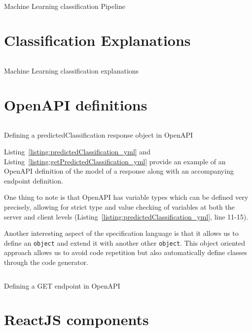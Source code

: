 \documentclass[\version]{l4proj}
\begin{document}
\begin{listing}[H]
    \inputminted{python}{code/ml_pipeline.py}
    \caption{Machine Learning classification Pipeline}\label{listing:ml_pipeline}
\end{listing}

\section{Classification Explanations}

\begin{listing}[H]
    \inputminted{python}{code/explanations.py}
    \caption{Machine Learning classification explanations}\label{listing:ml_explanations}
\end{listing}

\section{OpenAPI definitions}

\begin{listing}[H]
    \inputminted{yaml}{code/predictedClassification.yml}
    \caption{Defining a predictedClassification response object in OpenAPI}\label{listing:predictedClassification_yml}
\end{listing}

Listing~\ref{listing:predictedClassification_yml} and Listing~\ref{listing:getPredictedClassification_yml} provide an example of an OpenAPI definition of the model of a response along with an accompanying endpoint definition.

One thing to note is that OpenAPI has variable types which can be defined very precisely, allowing for strict type and value checking of variables at both the server and client levels (Listing~\ref{listing:predictedClassification_yml}, line 11-15).

Another interesting aspect of the specification language is that it allows us to define an \verb|object| and extend it with another other \verb|object|.
This object oriented approach allows us to avoid code repetition but also automatically define classes through the code generator.

\begin{listing}[H]
    \inputminted{yaml}{code/getPredictedClassification.yml}
    \caption{Defining a GET endpoint in OpenAPI}\label{listing:getPredictedClassification_yml}
\end{listing}

\section{ReactJS components}
\end{document}

